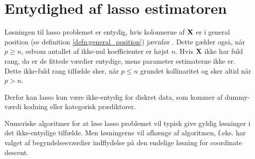\section{Entydighed af lasso estimatoren}
Løsningen til lasso problemet er entydig, hvis kolonnerne af \(\mathbf{X}\) er i general position (se definition \ref{defn:general_position}) jævnfør \citep{lasso_unique}.
Dette gælder også, når \(p \geq n\), selvom antallet af ikke-nul koefficienter er højst \(n\).
Hvis \(\mathbf{X}\) ikke har fuld rang, da er de fittede værdier entydige, mens parameter estimaterne ikke er.
Dette ikke-fuld rang tilfælde sker, når \(p \leq n\) grundet kollinaritet og sker altid når \(p>n\).
 


Derfor kan lasso kun være ikke-entydig for diskret data, som kommer af dummy-værdi kodning eller kategorisk prædiktorer.

Numeriske algoritmer for at løse lasso problemet vil typisk give gyldig løsninger i det ikke-entydige tilfælde.
Men løsningerne vil afhænge af algoritmen, f.eks. har valget af begyndelsesværdier indflydelse på den endelige løsning for coordinate descent.

%

\newpage

